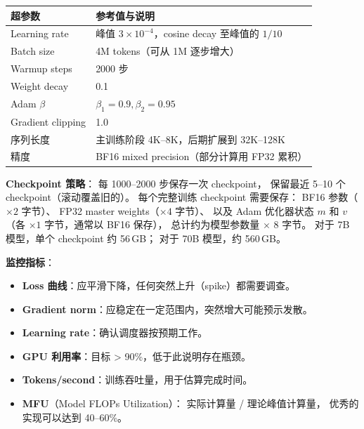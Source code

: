 \begin{corebox}
\begin{tabularx}{\linewidth}{l X}
\toprule
\textbf{超参数} & \textbf{参考值与说明} \\
\midrule
Learning rate & 峰值 $3 \times 10^{-4}$，cosine decay 至峰值的 $1/10$ \\
Batch size    & 4M tokens（可从 1M 逐步增大） \\
Warmup steps  & 2000 步 \\
Weight decay  & 0.1 \\
Adam $\beta$  & $\beta_1 = 0.9, \beta_2 = 0.95$ \\
Gradient clipping & 1.0 \\
序列长度      & 主训练阶段 4K--8K，后期扩展到 32K--128K \\
精度          & BF16 mixed precision（部分计算用 FP32 累积） \\
\bottomrule
\end{tabularx}
\end{corebox}

\textbf{Checkpoint 策略}：
每 1000--2000 步保存一次 checkpoint，
保留最近 5--10 个 checkpoint（滚动覆盖旧的）。
每个完整训练 checkpoint 需要保存：
BF16 参数（$\times 2$ 字节）、
FP32 master weights（$\times 4$ 字节）、
以及 Adam 优化器状态 $m$ 和 $v$（各 $\times 1$ 字节，通常以 BF16 保存），
总计约为模型参数量 $\times$ 8 字节。
对于 7B 模型，单个 checkpoint 约 56\,GB；
对于 70B 模型，约 560\,GB。

\textbf{监控指标}：
\begin{itemize}[noitemsep]
  \item \textbf{Loss 曲线}：应平滑下降，任何突然上升（spike）都需要调查。
  \item \textbf{Gradient norm}：应稳定在一定范围内，突然增大可能预示发散。
  \item \textbf{Learning rate}：确认调度器按预期工作。
  \item \textbf{GPU 利用率}：目标 > 90\%，低于此说明存在瓶颈。
  \item \textbf{Tokens/second}：训练吞吐量，用于估算完成时间。
  \item \textbf{MFU}（Model FLOPs Utilization）：
        实际计算量 / 理论峰值计算量，
        优秀的实现可以达到 40--60\%。
\end{itemize}

